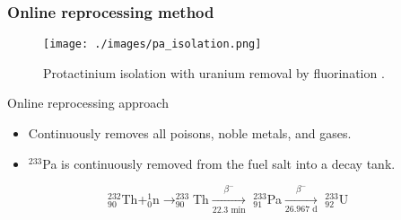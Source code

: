 \begin{frame}
  \frametitle{Online reprocessing method}
     \begin{figure}[t]
                \vspace*{-0.1in}
                \texttt{[image: ./images/pa\_isolation.png]}
                \vspace*{-0.09in}
                \caption{Protactinium isolation with uranium removal by fluorination \cite{robertson_conceptual_1971}.}
      \end{figure}
                      \vspace*{-0.22in}
             \begin{block}{Online reprocessing approach}
               \begin{itemize}             
               \item Continuously removes all poisons, noble metals, and gases.
               \item $^{233}$Pa is continuously removed from the fuel salt into a decay tank.
               \end{itemize}
               \end{block}
               \vspace{-0.05in}
$\qquad\qquad\qquad\qquad^{232}_{90}$Th+$^1_0$n$\rightarrow^{233}_{90}$Th$\xrightarrow[\text{22.3 min}]{\beta^-}$ $^{233}_{91}$Pa$\xrightarrow[\text{26.967 d}]{\beta^-}$ $^{233}_{92}$U
\end{frame}


